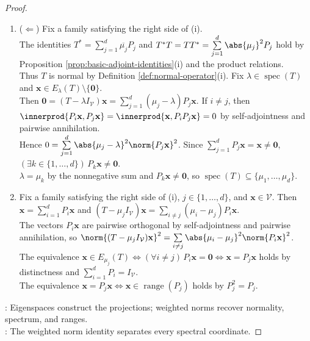 \begin{theorem}
\begin{proof}
\begin{enumerate}[label=(\roman*)]
The identity $T\mathbf{x}=\sum\limits_{j=1}^{d}\mu_j\mathbf{x}_j=\sum\limits_{j=1}^{d}\mu_jP_j\mathbf{x}$ holds by $\mathbf{x}_j\in E_{\mu_j}(T)$. Since $\mathbf{x}$ was arbitrary, the required operator identities hold.
\item[$(i)$] ($\Leftarrow$) Fix a family satisfying the right side of (i).\\
The identities $T^*=\sum\limits_{j=1}^{d}\overline{\mu_j}P_j$ and $T^*T=TT^*=\sum\limits_{j=1}^{d}\abs{\mu_j}^2P_j$ hold by Proposition \ref{prop:basic-adjoint-identities}(i) and the product relations.\\
Thus $T$ is normal by Definition \ref{def:normal-operator}(i). Fix $\lambda\in\operatorname{spec}(T)$ and $\mathbf{x}\in E_{\lambda}(T)\setminus\{\mathbf{0}\}$.\\
Then $\mathbf{0}=(T-\lambda I_{\mathcal{V}})\mathbf{x}=\sum\limits_{j=1}^{d}(\mu_j-\lambda)P_j\mathbf{x}$. If $i\neq j$, then $\innerprod{P_i\mathbf{x},P_j\mathbf{x}}=\innerprod{\mathbf{x},P_iP_j\mathbf{x}}=0$ by self-adjointness and pairwise annihilation.\\
Hence $0=\sum\limits_{j=1}^{d}\abs{\mu_j-\lambda}^2\norm{P_j\mathbf{x}}^2$. Since $\sum\limits_{j=1}^{d}P_j\mathbf{x}=\mathbf{x}\neq\mathbf{0}$, $(\exists k\in\{1,\ldots,d\})\,P_k\mathbf{x}\neq\mathbf{0}$.\\
$\lambda=\mu_k$ by the nonnegative sum and $P_k\mathbf{x}\neq\mathbf{0}$, so $\operatorname{spec}(T)\subseteq\{\mu_1,\ldots,\mu_d\}$.
\item[$(ii)$] Fix a family satisfying the right side of (i), $j\in\{1,\ldots,d\}$, and $\mathbf{x}\in\mathcal{V}$. Then $\mathbf{x}=\sum\limits_{i=1}^{d}P_i\mathbf{x}$ and $(T-\mu_jI_{\mathcal{V}})\mathbf{x}=\sum\limits_{i\neq j}(\mu_i-\mu_j)P_i\mathbf{x}$.\\
The vectors $P_i\mathbf{x}$ are pairwise orthogonal by self-adjointness and pairwise annihilation, so $\norm{(T-\mu_jI_{\mathcal{V}})\mathbf{x}}^2=\sum\limits_{i\neq j}\abs{\mu_i-\mu_j}^2\norm{P_i\mathbf{x}}^2$.\\
The equivalence $\mathbf{x}\in E_{\mu_j}(T)\Longleftrightarrow(\forall i\neq j)\,P_i\mathbf{x}=\mathbf{0}\Longleftrightarrow\mathbf{x}=P_j\mathbf{x}$ holds by distinctness and $\sum\limits_{i=1}^{d}P_i=I_{\mathcal{V}}$.\\
The equivalence $\mathbf{x}=P_j\mathbf{x}\Longleftrightarrow\mathbf{x}\in\operatorname{range}(P_j)$ holds by $P_j^2=P_j$.
\end{enumerate}
: Eigenspaces construct the projections; weighted norms recover normality, spectrum, and ranges.\\
: The weighted norm identity separates every spectral coordinate.
\end{proof}
\end{theorem}

